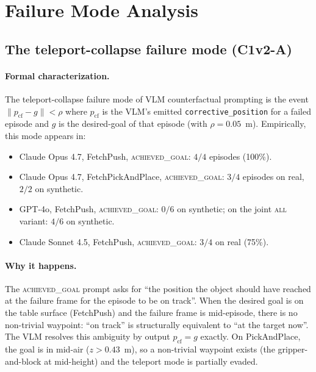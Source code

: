 \section{Failure Mode Analysis}
\label{app:failures}

\subsection{The teleport-collapse failure mode (C1v2-A)}
\label{app:teleport}

\paragraph{Formal characterization.}
The teleport-collapse failure mode of VLM counterfactual prompting is
the event $\|p_{\text{cf}}-g\|<\rho$ where $p_{\text{cf}}$ is the VLM's
emitted \texttt{corrective\_position} for a failed episode and $g$ is
the desired-goal of that episode (with $\rho\!=\!0.05$~m). Empirically,
this mode appears in:
\begin{itemize}\itemsep0pt
\item Claude Opus 4.7, FetchPush, \textsc{achieved\_goal}: $4/4$ episodes (100\%).
\item Claude Opus 4.7, FetchPickAndPlace, \textsc{achieved\_goal}: $3/4$ episodes on real, $2/2$ on synthetic.
\item GPT-4o, FetchPush, \textsc{achieved\_goal}: $0/6$ on synthetic;
on the joint \textsc{all} variant: $4/6$ on synthetic.
\item Claude Sonnet 4.5, FetchPush, \textsc{achieved\_goal}: $3/4$ on real (75\%).
\end{itemize}

\paragraph{Why it happens.}
The \textsc{achieved\_goal} prompt asks for ``the position the object
should have reached at the failure frame for the episode to be on
track''. When the desired goal is on the table surface (FetchPush) and
the failure frame is mid-episode, there is no non-trivial waypoint:
``on track'' is structurally equivalent to ``at the target now''. The
VLM resolves this ambiguity by output $p_{\text{cf}}=g$ exactly. On
PickAndPlace, the goal is in mid-air ($z>0.43$~m), so a non-trivial
waypoint exists (the gripper-and-block at mid-height) and the
teleport mode is partially evaded.

